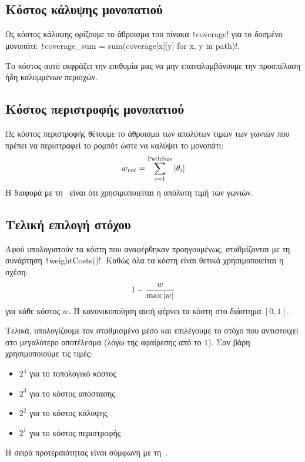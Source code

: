 \subsection{Κόστος κάλυψης μονοπατιού}\label{section:coverage-cost}
\sloppy Ως κόστος κάλυψης ορίζουμε το άθροισμα του πίνακα \texttt!coverage! για το δοσμένο μονοπάτι:
\texttt!coverage_sum = sum(coverage[x][y] for x, y in path)!.

Το κόστος αυτό εκφράζει την επιθυμία μας να μην επαναλαμβάνουμε την προσπέλαση ήδη καλυμμένων περιοχών.

\subsection{Κόστος περιστροφής μονοπατιού}\label{section:rotation-cost}
Ως κόστος περιστροφής θέτουμε το άθροισμα των απολύτων τιμών των γωνιών που πρέπει να περιστραφεί το ρομπότ ώστε να καλύψει το μονοπάτι:
\begin{equation}
    w_{rot} = \sum_{i=1}^{\text{PathSize}} \left\lvert\theta_i\right\rvert
\end{equation}
Η διαφορά με τη~\cite{etsardou-phd} είναι ότι χρησιμοποιείται η απόλυτη τιμή των γωνιών.

\subsection{Τελική επιλογή στόχου}
Αφού υπολογιστούν τα κόστη που αναφέρθηκαν προηγουμένως, σταθμίζονται με τη συνάρτηση \texttt!weightCosts()!.
Καθώς όλα τα κόστη είναι θετικά χρησιμοποιείται η σχέση:
\begin{equation}
    1 - \frac{w}{\max{\left\lvert w\right\rvert}}
\end{equation}
για κάθε κόστος $w$.
Η κανονικοποίηση αυτή φέρνει τα κόστη στο διάστημα $\left[0, 1\right]$.

Τελικά, υπολογίζουμε τον σταθμισμένο μέσο και επιλέγουμε το στόχο που αντιστοιχεί στο μεγαλύτερο αποτέλεσμα (λόγω της αφαίρεσης από το $1$).
Σαν βάρη χρησιμοποιούμε τις τιμές:
\begin{itemize}
    \item $2^4$ για το τοπολογικό κόστος
    \item $2^3$ για το κόστος απόστασης
    \item $2^2$ για το κόστος κάλυψης
    \item $2^1$ για το κόστος περιστροφής
\end{itemize}
Η σειρά προτεραιότητας είναι σύμφωνη με τη~\cite{etsardou-phd}.

